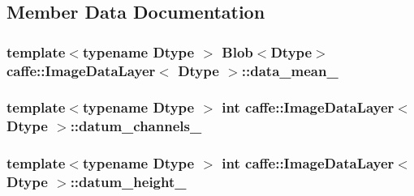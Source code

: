\subsection{Member Data Documentation}
\hypertarget{classcaffe_1_1_image_data_layer_aad14555c38b6c3b7c9c4c7153c3b2006}{
\subsubsection[{data\+\_\+mean\+\_\+}]{\setlength{\rightskip}{0pt plus 5cm}template$<$typename Dtype $>$ {\bf Blob}$<$Dtype$>$ {\bf caffe\+::\+Image\+Data\+Layer}$<$ Dtype $>$\+::data\+\_\+mean\+\_\+\hspace{0.3cm}{\ttfamily [protected]}}}\label{classcaffe_1_1_image_data_layer_aad14555c38b6c3b7c9c4c7153c3b2006}
\hypertarget{classcaffe_1_1_image_data_layer_a6534d716642ef3d9d95d19de3c28cafb}{
\subsubsection[{datum\+\_\+channels\+\_\+}]{\setlength{\rightskip}{0pt plus 5cm}template$<$typename Dtype $>$ int {\bf caffe\+::\+Image\+Data\+Layer}$<$ Dtype $>$\+::datum\+\_\+channels\+\_\+\hspace{0.3cm}{\ttfamily [protected]}}}\label{classcaffe_1_1_image_data_layer_a6534d716642ef3d9d95d19de3c28cafb}
\hypertarget{classcaffe_1_1_image_data_layer_a5eb0e9d6e6263a2c66f07f1218aeb2dd}{
\subsubsection[{datum\+\_\+height\+\_\+}]{\setlength{\rightskip}{0pt plus 5cm}template$<$typename Dtype $>$ int {\bf caffe\+::\+Image\+Data\+Layer}$<$ Dtype $>$\+::datum\+\_\+height\+\_\+\hspace{0.3cm}{\ttfamily [protected]}}}\label{classcaffe_1_1_image_data_layer_a5eb0e9d6e6263a2c66f07f1218aeb2dd}
